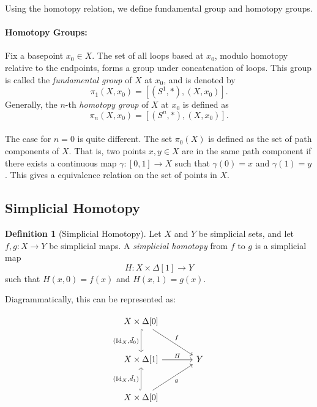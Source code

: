 \documentclass[11pt]{article}
\theoremstyle{definition}
\newtheorem{definition}{Definition}[section]
\theoremstyle{plain}
\begin{document}
Using the homotopy relation, we define fundamental group and homotopy groups.








\paragraph{Homotopy Groups:}

Fix a basepoint $x_0 \in X$. The set of all loops based at $x_0$, modulo homotopy relative to the endpoints, forms a group under concatenation of loops.
This group is called the \emph{fundamental group} of $X$ at $x_0$, and is denoted by
\[
    \pi_1(X, x_0) =[(S^1, \ast  ),(X, x_0)].
\]
Generally, the $n$-th \emph{homotopy group} of $X$ at $x_0$ is defined as
\[
    \pi_n(X, x_0) =[(S^n, \ast  ),(X, x_0)].
\]

\paragraph{}
The case for $n=0$ is quite different. The set $\pi_0(X)$ is defined as the set of path components of $X$. That is, two points $x,y \in X$ are in the same path component if there exists a continuous map $\gamma : [0,1] \to X$ such that $\gamma(0) = x$ and $\gamma(1) = y$. This gives a equivalence relation on the set of points in $X$.


\subsection{Simplicial Homotopy}

\begin{definition}[Simplicial Homotopy]
    Let $X$ and $Y$ be simplicial sets, and let $f, g : X \to Y$ be simplicial maps. A \emph{simplicial homotopy} from $f$ to $g$ is a simplicial map
    \[
        H : X \times \Delta[1] \to Y
    \]
    such that $H(x, 0) = f(x)$ and $H(x, 1) = g(x)$.
\end{definition}

Diagrammatically, this can be represented as:

\[
    \begin{tikzcd}[row sep=large, column sep=large]
        X \times \Delta[0] \arrow[d,hook,"{(\mathrm{Id}_X,\tilde{d_0})}"'] \arrow[dr,"f"] & \\
        X \times \Delta[1] \arrow[r,"H"] & Y \\
        X \times \Delta[0] \arrow[u,hook,"{(\mathrm{Id}_X,\tilde{d_1})}"] \arrow[ur,"g"'] &
    \end{tikzcd}
\]
\end{document}
